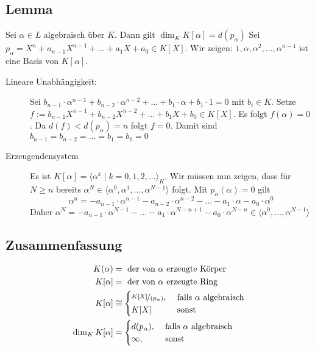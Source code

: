 \subsection[{Lemma: Zusammenhang zwischen dem Grad von $K[\alpha]$ und $p_\alpha$}]{Lemma} %
\label{sub:1122}
Sei $\alpha \in L$ algebraisch über $K$. Dann gilt $\dim_K K[\alpha] = d(p_\alpha)$
Sei $p_\alpha = X^n + a_{n-1} X^{n-1} + \ldots + a_1 X + a_0 \in K[X]$. Wir zeigen: $1, \alpha, \alpha^2, \ldots , \alpha^{n-1}$ ist eine Basis von $K[\alpha]$.
\begin{description}
	\item[Lineare Unabhängigkeit:] Sei $b_{n-1} \cdot \alpha^{n-1} + b_{n-2}\cdot \alpha^{n-2}+ \ldots + b_1 \cdot \alpha + b_1 \cdot 1 =0$ mit $b_i \in K$.
	Setze $f := b_{n-1} X^{n-1}+ b_{n-2}X^{n-2} + \ldots + b_1 X + b_0 \in K[X]$. Es folgt $f(\alpha)=0$. Da $d(f) < d(p_\alpha) =n$ folgt $f=0$. Damit sind 
	$b_{n-1}=b_{n-2}= \ldots = b_1 =b_0=0$
	\item[Erzeugendensystem] Es ist $K[\alpha] = \langle \alpha^k \mid k=0,1,2, \ldots \rangle_K$.  
	Wir müssen nun zeigen, dass für $N\ge n$ bereits $\alpha^N \in \langle\alpha^0, \alpha^1, \ldots , \alpha^{N-1} \rangle$ folgt.
	Mit $p_\alpha(\alpha) =0$ gilt 
	\[
		\alpha^n = - a_{n-1}\cdot \alpha^{n-1} - a_{n-2}\cdot \alpha^{n-2}- \ldots  - a_1 \cdot \alpha - a_0 \cdot \alpha^0
	\]
	Daher $\alpha^N = - a_{n-1}\cdot \alpha^{N-1} - \ldots - a_1 \cdot \alpha^{N-n+1}- a_0 \cdot \alpha^{N-n} \in \langle \alpha^0, \ldots , \alpha^{N-1} \rangle$ \bewende
\end{description}

\subsection[Zusammenfassung des bisher gezeigten]{Zusammenfassung} %
\label{sub:1123}
\begin{align*}
	K(\alpha) &= \text{ der von $\alpha$ erzeugte Körper} \\
	K[\alpha] &= \text{ der von $\alpha$ erzeugte Ring} \\
	K[\alpha] &\cong \begin{cases}
		\nicefrac{K[X]}{(p_\alpha)}, &\text{ falls }\alpha \text{ algebraisch}\\
		K[X] &\text{ sonst}
	\end{cases} \\
	\dim_K K[\alpha] &= \begin{cases}
		d(p_\alpha), &\text{ falls }\alpha \text{ algebraisch}\\
		\infty ,&\text{ sonst}
	\end{cases}
\end{align*}

